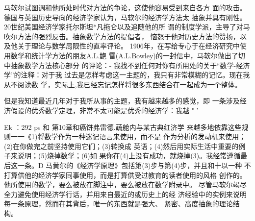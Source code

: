马软尔试图调和他所处时代对方法的争论，这使他容易受到来自各方
面的攻击。德国与英国历史导向的经济学家认为，马软尔的经济学方法太
抽象并具有刚性。20世纪美国经济学家托尔斯坦*凡拖仑以及追随他的所
谓的制度学派，主导了对马吹尔方法的强烈反击。抽象数学方法的提倡者，
恼怒于他对历史方法的赞扬，以及他关于理论与数学局限性的直率评论。
1906年，在写给专心于在经济研究中使用数学和统计学方法的朋友A.L.鲍
雷(A.L.Bowley)的一封信中，马软尔做出了切中抽象数学方法核心部分
的评论：-
我找不到任何对你有所用处的关于“数学-经济学”的注释：对于我
过去是怎样考虑这一主题的，我只有非常模糊的记忆。现在我从不阅读数
学，实际上,我已经忘记怎样将很多东西结合在一起成为一个整体。

但是我知道最近几年对于我所从事的主题，我有越来越多的感觉，即
一条涉及经济假设的优秀数学定理，非常不太可能是优秀的经济学：我越
"
'

Ek
：292
ps
和
第10章和癌饼弗雷德.蔬舱内与某古典红济学
来越多地依靠这些规则一一《1)将数学作为一种迷记语言来使用，而不是
作为分析的发动机来使用；(2)在你做完之前坚持使用它们；(3)转换成
英语；(4)然后用实际生活中重要的例子来说明；(5)烧掉数学；(6)如
果你在(4)上没有成功，就烧掉(3)。我经常遵循最后这一条。D
马黄尔的《经济学原理》包括第(3)步与第(4)步，并且和十以一种
不打算供他的经济学家同事使用，而是打算供受过教育的读者使用的风格
创作的。他所使用的数学，要么被放在脚注中，要么被放在数学附录中。
尽管马软尔竭尽全力避免使用经济学行话，并用来自最近的或历史上的经
济经验中的实例来说明每一条原理，然而在其背后，唯一的东西就是强大、
紧密、高度抽象的理论结构。

